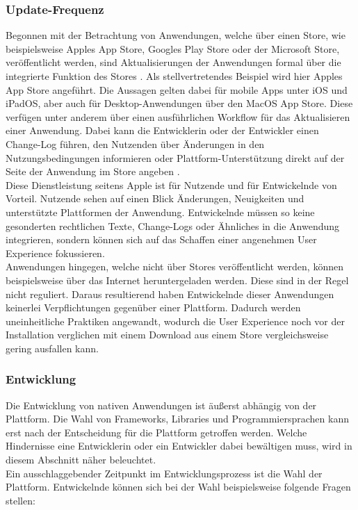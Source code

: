 \documentclass[a4paper]{scrartcl}
\begin{document}
\subsubsection{Update-Frequenz}

Begonnen mit der Betrachtung von Anwendungen, welche über einen Store, wie beispielsweise Apples App Store, Googles Play Store oder der Microsoft Store, veröffentlicht werden, sind Aktualisierungen der Anwendungen formal über die integrierte Funktion des Stores \autocite[28]{Jobe}. Als stellvertretendes Beispiel wird hier Apples App Store angeführt. Die Aussagen gelten dabei für mobile Apps unter iOS und iPadOS, aber auch für Desktop-Anwendungen über den MacOS App Store. Diese verfügen unter anderem über einen ausführlichen Workflow für das Aktualisieren einer Anwendung. Dabei kann die Entwicklerin oder der Entwickler einen Change-Log führen, den Nutzenden über Änderungen in den Nutzungsbedingungen informieren oder Plattform-Unterstützung direkt auf der Seite der Anwendung im Store angeben \autocite{Appstore_Updates}. \\
Diese Dienstleistung seitens Apple ist für Nutzende und für Entwickelnde von Vorteil. Nutzende sehen auf einen Blick Änderungen, Neuigkeiten und unterstützte Plattformen der Anwendung. Entwickelnde müssen so keine gesonderten rechtlichen Texte, Change-Logs oder Ähnliches in die Anwendung integrieren, sondern können sich auf das Schaffen einer angenehmen User Experience fokussieren. \\

Anwendungen hingegen, welche nicht über Stores veröffentlicht werden, können beispielsweise über das Internet heruntergeladen werden. Diese sind in der Regel nicht reguliert. Daraus resultierend haben Entwickelnde dieser Anwendungen keinerlei Verpflichtungen gegenüber einer Plattform. Dadurch werden uneinheitliche Praktiken angewandt, wodurch die User Experience noch vor der Installation verglichen mit einem Download aus einem Store vergleichsweise gering ausfallen kann. 


\subsubsection{Entwicklung}

Die Entwicklung von nativen Anwendungen ist äußerst abhängig von der Plattform. Die Wahl von Frameworks, Libraries und Programmiersprachen kann erst nach der Entscheidung für die Plattform getroffen werden. Welche Hindernisse eine Entwicklerin oder ein Entwickler dabei bewältigen muss, wird in diesem Abschnitt näher beleuchtet. \\
Ein ausschlaggebender Zeitpunkt im Entwicklungsprozess ist die Wahl der Plattform. Entwickelnde können sich bei der Wahl beispielsweise folgende Fragen stellen: 
\end{document}
